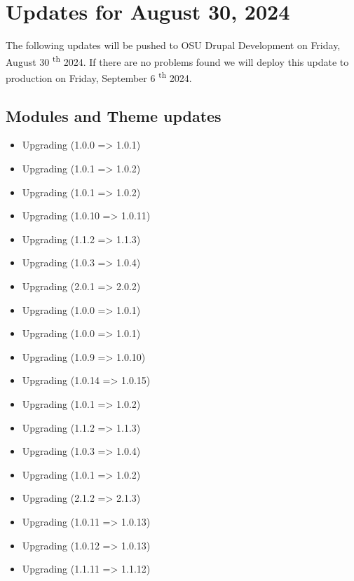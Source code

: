 \section{Updates for August 30, 2024}
The following updates will be pushed to OSU Drupal Development on Friday, August 30 \textsuperscript{th} 2024.
If there are no problems found we will deploy this update to production on Friday, September 6 \textsuperscript{th} 2024.
\subsection{Modules and Theme updates}
\begin{itemize}
    \item Upgrading  (1.0.0 => 1.0.1)
    \item Upgrading  (1.0.1 => 1.0.2)
    \item Upgrading  (1.0.1 => 1.0.2)
    \item Upgrading  (1.0.10 => 1.0.11)
    \item Upgrading  (1.1.2 => 1.1.3)
    \item Upgrading  (1.0.3 => 1.0.4)
    \item Upgrading  (2.0.1 => 2.0.2)
    \item Upgrading  (1.0.0 => 1.0.1)
    \item Upgrading  (1.0.0 => 1.0.1)
    \item Upgrading  (1.0.9 => 1.0.10)
    \item Upgrading  (1.0.14 => 1.0.15)
    \item Upgrading  (1.0.1 => 1.0.2)
    \item Upgrading  (1.1.2 => 1.1.3)
    \item Upgrading  (1.0.3 => 1.0.4)
    \item Upgrading  (1.0.1 => 1.0.2)
    \item Upgrading  (2.1.2 => 2.1.3)
    \item Upgrading  (1.0.11 => 1.0.13)
    \item Upgrading  (1.0.12 => 1.0.13)
    \item Upgrading  (1.1.11 => 1.1.12)
\end{itemize}
